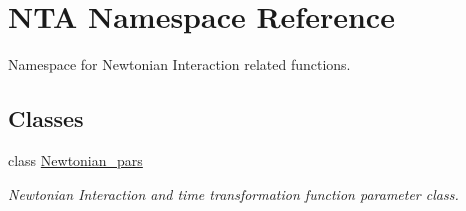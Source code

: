 \hypertarget{namespaceNTA}{}\section{N\+TA Namespace Reference}
\label{namespaceNTA}


Namespace for Newtonian Interaction related functions.  


\subsection*{Classes}
\begin{DoxyCompactItemize}
\item 
class \hyperlink{classNTA_1_1Newtonian__pars}{Newtonian\+\_\+pars}
\begin{DoxyCompactList}\small\item\em Newtonian Interaction and time transformation function parameter class. \end{DoxyCompactList}\end{DoxyCompactItemize}
